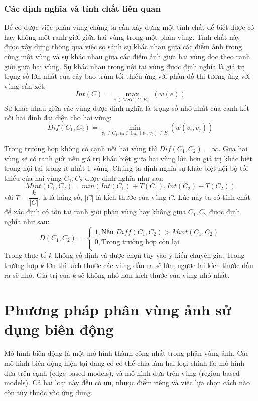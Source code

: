 \documentclass[12pt,oneside,a4]{report}
\begin{document}
\subsection{Các định nghĩa và tính chất liên quan}
Để có được việc phân vùng chúng ta cần xây dựng một tính chất để biết được có hay không môt ranh giới giữa hai vùng trong một phân vùng. Tính chất này được xây dựng thông qua việc so sánh sự khác nhau giữa các điểm ảnh trong cùng một vùng và sự khác nhau giữa các điểm ảnh giữa hai vùng dọc theo ranh giới giữa hai vùng.
Sự khác nhau trong nội tại vùng được định nghĩa là giá trị trọng số lớn nhất của cây bao trùm tối thiểu ứng với phần đồ thị tương ứng với vùng cần xét:
\begin{equation}
Int(C)=\max_{e\in MST(C,E)}(w(e))
\end{equation}
Sự khác nhau giữa các vùng được định nghĩa là trọng số nhỏ nhất của cạnh kết nối hai đỉnh đại diện cho hai vùng:
\begin{equation}
Dif(C_1,C_2)=\min_{v_1\in C_1, v_2 \in C_2,(v_1, v_2) \in E}(w(v_i, v_j))
\end{equation}

Trong trường hợp không có cạnh nối hai vùng thì $Dif(C_1,C_2)= \infty$. Gữa hai vùng sẽ có ranh giới nếu giá trị khác biệt giữa hai vùng lớn hơn giá trị khác biệt trong nội tại trong ít nhất 1 vùng. 
Chúng ta định nghĩa  sự khác biệt nội bộ tối thiểu của hai vùng $C_1, C_2$ được định nghĩa như sau: 
\begin{equation}
Mint(C_1, C_2)= min(Int(C_1)+T(C_1),Int(C_2)+T(C_2))
\end{equation}
với $T=\dfrac{k}{|C|}$, k là hằng số, $|C|$ là kích thước của vùng $C$. Lúc này ta có tính chất để xác định có tồn tại ranh giới phân vùng hay không giữa $C_1, C_2$  được định nghĩa như sau:
\begin{equation}
D(C_1, C_2)=
\begin{cases}
 1, \textrm{Nếu } Diff(C_1, C_2)>Mint(C_1, C_2)\\
 0, \textrm{Trong trường hợp còn lại}\\
   \end{cases}
\end{equation}
Trong thực tế $k$ không cố định và được chọn tùy vào ý kiến chuyên gia. Trong trường hợp $ k$ lớn thì kích thước các vùng đầu ra sẽ lớn, ngược lại kích thước đầu ra sẽ nhỏ. Giá trị của $k$ sẽ không nhỏ hơn kích thước  của vùng nhỏ nhất.
\chapter{Phương pháp phân vùng ảnh sử dụng biên động}
Mô hình biên động là một mô hình thành công nhất trong phân vùng ảnh. Các mô hình biên động hiện tại đang có có thể chia làm hai loại chính là: mô hình dựa trên cạnh (edge-based models), và mô hình dựa trên vùng (region-based models). Cả hai loại này đều có ưu, nhược điểm riêng và việc lựa chọn cách nào còn tùy thuộc vào ứng dụng.
\end{document}
